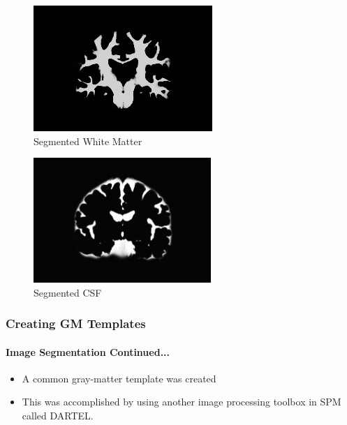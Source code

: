 \documentclass{beamer}
\begin{document}
  \begin{frame}

    \vskip 20pt

    \begin{figure}[H]
      \centering
      \includegraphics[width=0.6\linewidth]{./.img/white-matter.jpg}
      \caption{Segmented White Matter}%
      \label{fig:./.img/grey-matter}
    \end{figure}

  \end{frame}
  \begin{frame}[t]

    \vskip 20pt

    \begin{figure}[H]
      \centering
      \includegraphics[width=0.6\textwidth]{./.img/csf.jpg}
      \caption{Segmented CSF}
    \end{figure}
  \end{frame}

  \begin{frame}[t]
    \frametitle{Creating GM Templates}
    \framesubtitle{Image Segmentation Continued...}

    \begin{itemize}

      \vskip 25pt

      \item  A common gray-matter template was created  \vskip 10pt

      \item This was accomplished by using another image processing
        toolbox in SPM called DARTEL. \vskip 10pt

    \end{itemize}

  \end{frame}
\end{document}
